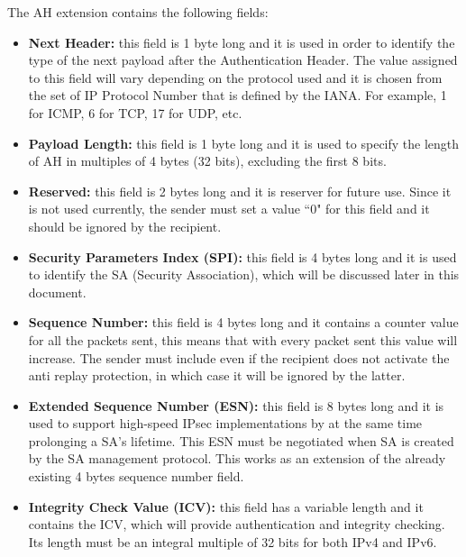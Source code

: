 \documentclass[11pt]{book}
\begin{document}
The AH extension contains the following fields:
\begin{itemize}
\item \textbf{Next Header:} this field is 1 byte long and it is used in order to identify the type of the next payload after the Authentication Header. The value assigned to this field will vary depending on the protocol used and it is chosen from the set of IP Protocol Number that is defined by the IANA. For example, 1 for ICMP, 6 for TCP, 17 for UDP, etc. 
\item \textbf{Payload Length:} this field is 1 byte long and it is used to specify the length of AH in multiples of 4 bytes (32 bits), excluding the first 8 bits.
\item \textbf{Reserved:} this field is 2 bytes long and it is reserver for future use. Since it is not used currently, the sender must set a value ``0" for this field and it should be ignored by the recipient. 
\item \textbf{Security Parameters Index (SPI):} this field is 4 bytes long and it is used to identify the SA (Security Association), which will be discussed later in this document. 
\item \textbf{Sequence Number:} this field is 4 bytes long and it contains a counter value for all the packets sent, this means that with every packet sent this value will increase. The sender must include even if the recipient does not activate the anti replay protection, in which case it will be ignored by the latter.
\item \textbf{Extended Sequence Number (ESN):} this field is 8 bytes long and it is used to support high-speed IPsec implementations by at the same time prolonging a SA's lifetime. This ESN must be negotiated when SA is created by the SA management protocol. This works as an extension of the already existing 4 bytes sequence number field.
\item \textbf{Integrity Check Value (ICV):} this field has a variable length and it contains the ICV, which will provide authentication and integrity checking. Its length must be an integral multiple of 32 bits for both IPv4 and IPv6. 
\end{itemize}

\break
\end{document}
